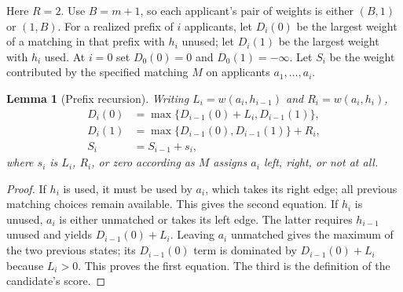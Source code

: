 \documentclass[11pt]{article}
\newtheorem{lemma}[theorem]{Lemma}
\theoremstyle{remark}
\begin{document}
Here $R=2$. Use $B=m+1$, so each applicant's pair of weights is either $(B,1)$ or $(1,B)$. For a realized prefix of $i$ applicants, let $D_i(0)$ be the largest weight of a matching in that prefix with $h_i$ unused; let $D_i(1)$ be the largest weight with $h_i$ used. At $i=0$ set $D_0(0)=0$ and $D_0(1)=-\infty$. Let $S_i$ be the weight contributed by the specified matching $M$ on applicants $a_1,\ldots,a_i$.

\begin{lemma}[Prefix recursion]\label{pathrec}
Writing $L_i=w(a_i,h_{i-1})$ and $R_i=w(a_i,h_i)$,
\begin{align*}
 D_i(0)&=\max\{D_{i-1}(0)+L_i,D_{i-1}(1)\},\\
 D_i(1)&=\max\{D_{i-1}(0),D_{i-1}(1)\}+R_i,\\
 S_i&=S_{i-1}+s_i,
\end{align*}
where $s_i$ is $L_i$, $R_i$, or zero according as $M$ assigns $a_i$ left, right, or not at all.
\end{lemma}
\begin{proof}
If $h_i$ is used, it must be used by $a_i$, which takes its right edge; all previous matching choices remain available. This gives the second equation. If $h_i$ is unused, $a_i$ is either unmatched or takes its left edge. The latter requires $h_{i-1}$ unused and yields $D_{i-1}(0)+L_i$. Leaving $a_i$ unmatched gives the maximum of the two previous states; its $D_{i-1}(0)$ term is dominated by $D_{i-1}(0)+L_i$ because $L_i>0$. This proves the first equation. The third is the definition of the candidate's score.
\end{proof}
\end{document}

